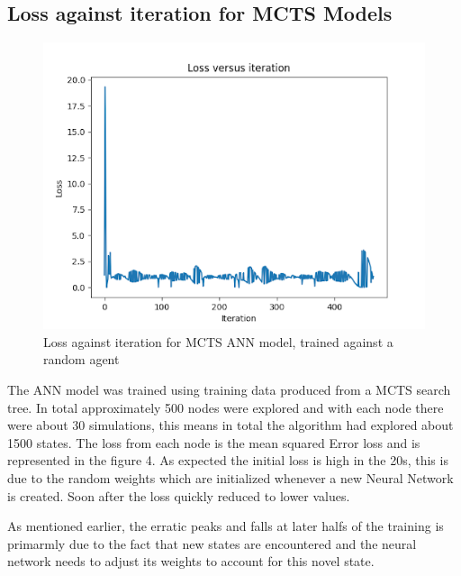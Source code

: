 \documentclass[a4paper,12pt,table]{article}
\begin{document}
\subsection{Loss against iteration for MCTS Models}
\begin{figure}[H]
    \begin{center}
        \includegraphics[scale=0.8]{MCTS_ANN.png}
        \caption{Loss against iteration for MCTS ANN model, trained against a random agent}
        \label{fig:}
    \end{center}
\end{figure}

The ANN model was trained using training data produced from a MCTS search tree. In total approximately 500 nodes were explored and with each node there were about 30 simulations, this means in total the algorithm had explored about 1500 states. The loss from each node is the mean squared Error loss and is represented in the figure 4. As expected the initial loss is high in the 20s, this is due to the random weights which are initialized whenever a new Neural Network is created. Soon after the loss quickly reduced to lower values. \par

As mentioned earlier, the erratic peaks and falls at later halfs of the training is primarmly due to the fact that new states are encountered and the neural network needs to adjust its weights to account for this novel state.  \par
\end{document}
